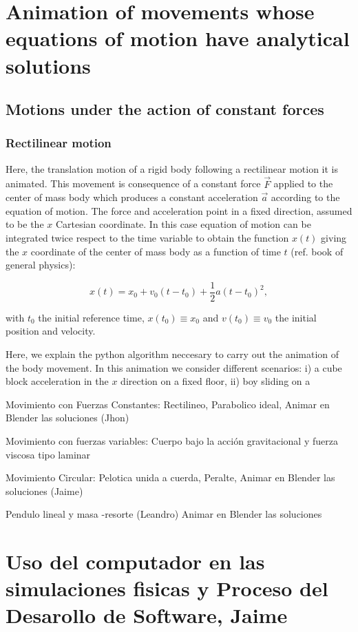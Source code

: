 \documentclass[12pt, letterpaper]{article}
\begin{document}
\section{Animation of movements whose equations of motion have analytical solutions}
\subsection{Motions under the action of constant forces}
\subsubsection{Rectilinear motion}
Here, the translation motion of a rigid body following a rectilinear motion it is animated. This movement is consequence of a constant force $\vec{F}$ applied to the center of mass body which produces a constant acceleration $\vec{a}$ according to the equation of motion. The force and acceleration point in a fixed direction, assumed to be the $x$ Cartesian coordinate. In this case equation of motion can be integrated twice respect to the time variable to obtain the function $x(t)$ giving the $x$ coordinate of the center of mass body as a function of time $t$ (ref. book of general physics):

\begin{equation}
x(t)=x_0+v_0(t-t_0)+\frac{1}{2}a(t-t_0)^2,
\end{equation}

with $t_0$ the initial reference time, $x(t_0)\equiv x_0$ and $v(t_0)\equiv v_0$ the initial position and velocity.

Here, we explain the python algorithm neccesary to carry out the animation of the body movement. In this animation we consider different scenarios: i) a cube block acceleration in the $x$ direction on a fixed floor, ii) boy sliding on a 


Movimiento con Fuerzas Constantes: Rectilineo, Parabolico ideal, Animar en Blender las soluciones (Jhon)

Movimiento con fuerzas variables: Cuerpo bajo la acción gravitacional y fuerza viscosa tipo laminar

Movimiento Circular: Pelotica unida a cuerda, Peralte, Animar en Blender las soluciones (Jaime)

Pendulo lineal y masa -resorte (Leandro)  Animar en Blender las soluciones


\section{Uso del computador en las simulaciones fisicas y Proceso del Desarollo de Software, Jaime}
\end{document}
